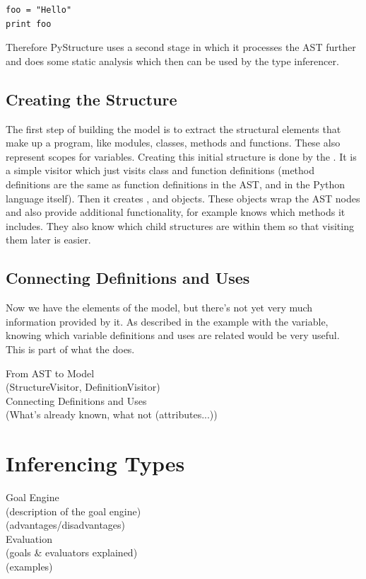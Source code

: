 \documentclass[12pt,halfparskip]{scrreprt}
\begin{document}
\begin{lstlisting}
foo = "Hello"
print foo
\end{lstlisting}

Therefore PyStructure uses a second stage in which it processes the AST further and does some static analysis which then can be used by the type inferencer.


\subsection{Creating the Structure}

The first step of building the model is to extract the structural elements that make up a program, like modules, classes, methods and functions. These also represent scopes for variables. Creating this initial structure is done by the . It is a simple visitor which just visits class and function definitions (method definitions are the same as function definitions in the AST, and in the Python language itself). Then it creates ,  and  objects. These objects wrap the AST nodes and also provide additional functionality, for example  knows which methods it includes. They also know which child structures are within them so that visiting them later is easier.

\subsection{Connecting Definitions and Uses}

Now we have the elements of the model, but there's not yet very much information provided by it. As described in the example with the  variable, knowing which variable definitions and uses are related would be very useful. This is part of what the  does.



From AST to Model \\
(StructureVisitor, DefinitionVisitor)\\
Connecting Definitions and Uses\\
(What's already known, what not (attributes...))\\


\section{Inferencing Types}
Goal Engine \\
 (description of the goal engine)\\
 (advantages/disadvantages)\\
Evaluation\\
 (goals \& evaluators explained)\\
 (examples)\\
\end{document}
